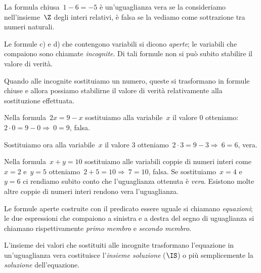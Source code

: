  \begin{esempio}
 La formula chiusa~\(1 - 6 = -5\) è un'uguaglianza
vera se la consideriamo nell'insieme~\(\Z\) degli interi
relativi, è falsa se la vediamo come sottrazione tra numeri naturali.
 \end{esempio}

Le formule c) e d) che contengono variabili si dicono \emph{aperte}; le 
variabili che compaiono sono chiamate
\emph{incognite}. Di tali formule non si può subito stabilire il valore di 
verità.

Quando alle incognite sostituiamo un numero, queste si trasformano in
formule chiuse e allora possiamo stabilirne il valore di verità
relativamente alla sostituzione effettuata.

 \begin{esempio}
 Nella formula~\(2x = 9 - x\) sostituiamo alla variabile~\(x\) il valore 
\(0\) 
otteniamo:~\(2\cdot 0=9-0 \Rightarrow~0=9\), falsa.

 Sostituiamo ora alla
variabile~\(x\) il valore \(3\) otteniamo~\(2\cdot 3=9-3 \Rightarrow~6=6\), 
vera.
 \end{esempio}

 \begin{esempio}
 Nella formula~\(x + y = 10\) sostituiamo
alle variabili coppie di numeri interi come~\(x = 2\) e~\(y = 5\) 
otteniamo~\(2+5=10\Rightarrow~7= 10\), falsa. Se
sostituiamo~\(x = 4\) e~\(y = 6\) ci rendiamo subito conto che
l'uguaglianza ottenuta è \emph{vera}. Esistono
molte altre coppie di numeri interi rendono vera
l'uguaglianza.
 \end{esempio}

\begin{definizione}
 Le formule aperte costruite con il predicato essere uguale si chiamano
\emph{equazioni}; le due espressioni che compaiono a sinistra e a
destra del segno di uguaglianza si chiamano rispettivamente
\emph{primo membro} e \emph{secondo membro}.

L'insieme dei valori che sostituiti alle incognite trasformano l'equazione in
un'uguaglianza vera costituisce
l'\emph{insieme soluzione} (\(\IS\)) o più semplicemente la \emph{soluzione} 
dell'equazione.
\end{definizione}

